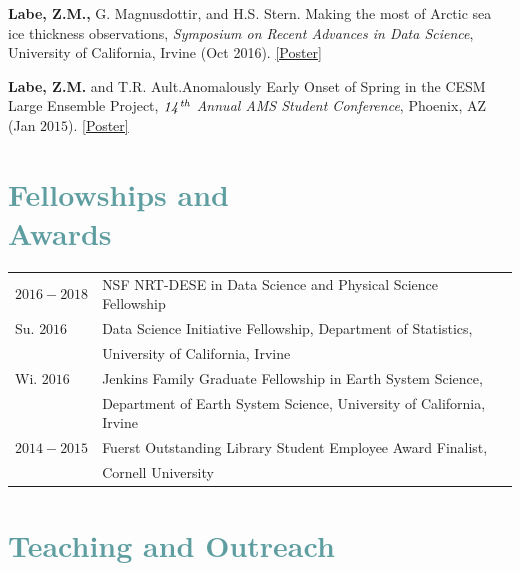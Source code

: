 \documentclass[margin,line,palatino,courier,10pt]{res}
\begin{document}
\begin{resume}
\begin{etaremune}[leftmargin=0in,topsep=0in,parsep=0in]
\item \textbf{Labe, Z.M.,} G. Magnusdottir, and H.S. Stern. Making the most of Arctic sea ice thickness observations, \textit{Symposium on Recent Advances in Data Science}, University of California, Irvine (Oct 2016). \href{http://sites.uci.edu/zlabe/files/2016/10/ZLabeMagnusdottirStern_DSIposter_Oct16.pdf}{[Poster]}

\item \textbf{Labe, Z.M.} and T.R. Ault.\@ Anomalously Early Onset of Spring in the CESM Large Ensemble Project, \textit{$\it{14^{th}}$ Annual AMS Student Conference}, Phoenix, AZ (Jan $2015$). \href{https://ams.confex.com/ams/95Annual/webprogram/Paper271063.html}{[Poster]} 

\end{etaremune}

\section{\sc \textcolor{CadetBlue}{\large{Fellowships and\\ Awards}}}
\vspace*{0.04in}
\begin{tabular}{@{}p{0.8in}p{4in}}
$2016-2018$ & NSF NRT-DESE in Data Science and Physical Science Fellowship\\
Su. $2016$ & Data Science Initiative Fellowship, Department of Statistics, \\
& University of California, Irvine\\
Wi. $2016$ & Jenkins Family Graduate Fellowship in Earth System Science,\\ 
& Department of Earth System
Science, University of California, Irvine\\
$2014-2015$ & Fuerst Outstanding Library Student Employee Award Finalist,\\
& Cornell University
\end{tabular}

\newpage

\vspace{-0.1in}
\noindent\makebox[\linewidth][r]{\rule{\textwidth}{5pt}}
\vspace{-0.3in}

\section{\sc \textcolor{CadetBlue}{\large{Teaching and Outreach}}}


\end{resume}
\end{document}
